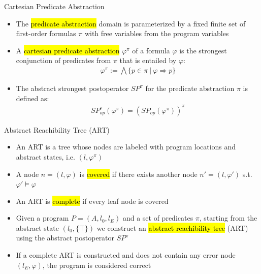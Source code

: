 \begin{frame}{Cartesian Predicate Abstraction}
\begin{itemize}
  \itemsep1em 
  \item The \hl{predicate abstraction} domain is parameterized by a fixed
  finite set of first-order formulas $\pi$ with free variables from the
  program variables
  
  \item A \hl{cartesian predicate abstraction} $\varphi^\pi$ of a
  formula $\varphi$ is the strongest conjunction of predicates from
  $\pi$ that is entailed by $\varphi$:
    \begin{align*}
      \varphi^\pi := \bigwedge \{ p \in \pi \ | \ \varphi \Rightarrow p \}
    \end{align*}
  
  \item The abstract strongest postoperator $SP^\pi$ for the predicate
  abstraction $\pi$ is defined as:
    \begin{align*}
      SP_{op}^{\pi}(\varphi^\pi) =
      (SP_{op}(\varphi^\pi))^{\pi}
    \end{align*} 
\end{itemize}

\end{frame}


\begin{frame}{Abstract Reachibility Tree (ART)}
\begin{itemize}
  \itemsep1em 
  
  \item An ART is a tree whose nodes are labeled with program locations and
  abstract states, i.e. $(l, \varphi^\pi)$
  
  \item A node $n = (l, \varphi)$ is \hl{covered} if there exists another
  node $n' = (l, \varphi')$ s.t. $\varphi' \models \varphi$
  
  \item An ART is \hl{complete} if every leaf node is covered
  
  \item Given a program $P = (A, l_0, l_E)$ and a set of predicates $\pi$,
  starting from the abstract state $(l_0, \{ \top \})$ we construct an
  \hl{abstract reachibility tree} (ART) using the abstract postoperator $SP^\pi$   
  
  \item If a complete ART is constructed and does not contain any error node
  $(l_E, \varphi)$, the program is considered correct
  
\end{itemize}
\end{frame}


